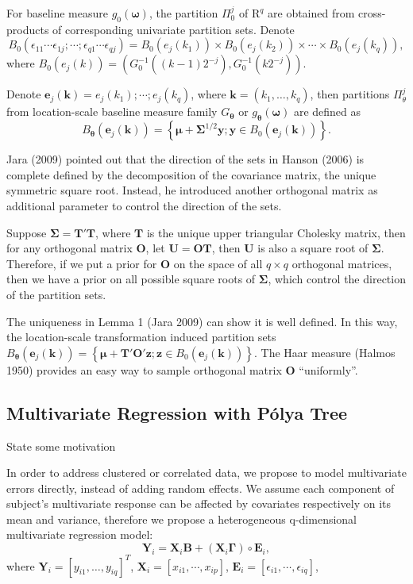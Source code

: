 \documentclass{article}
\newcommand{\polya}{P\'{o}lya}
\begin{document}
For baseline measure $g_0(\bm{\omega})$, the partition $\Pi_0^j$ of
$\mathrm{R}^q$ are obtained from cross-products of corresponding
univariate partition sets. Denote 
$$B_0( \epsilon_{11}\cdots
    \epsilon_{1j};\cdots;\epsilon_{q1}\cdots\epsilon_{qj}) =
    B_0(e_j(k_1)) \times B_0(e_j(k_2)) \times \cdots \times
    B_0(e_j(k_q)),$$
where $B_0(e_j(k))= \left( G_0^{-1}((k-1)2^{-j}), G_0^{-1}(k2^{-j})
\right)$. 

Denote $\bm{e}_j(\bm{k})= e_j(k_1); \cdots;e_j(k_q)$, where $\bm{k}=
(k_1, \ldots, k_q)$, then partitions $\Pi_{\theta}^j$ from
location-scale baseline measure family $G_{\bm{\theta}}$ or
$g_{\bm{\theta}}(\bm{\omega})$ are defined as 
\begin{displaymath}
B_{\bm{\theta}}(\bm{e}_j(\bm{k})) = \left\{ \bm{\mu} +
  \bm{\Sigma}^{1/2} \bm{y}; \bm{y} \in B_0(\bm{e}_j(\bm{k})) \right\}.
\end{displaymath}

Jara (2009) pointed out that the direction of the sets in Hanson
(2006) is complete defined by the decomposition of the covariance
matrix, the unique symmetric square root. Instead, he introduced
another orthogonal matrix as additional parameter to control the
direction of the sets. 

Suppose $\bm{\Sigma} = \bm{T'T}$, where $\bm{T}$ is the unique upper
triangular Cholesky matrix, then for any orthogonal matrix $\bm{O}$,
let $\bm{U=OT}$, then $\bm{U}$ is also a square root of
$\bm{\Sigma}$. Therefore, if we put a prior for $\bm{O}$ on the space
of all $q \times q$ orthogonal matrices, then we have a prior on all
possible square roots of $\bm{\Sigma}$, which control the direction of
the partition sets.

The uniqueness in Lemma 1 (Jara 2009) can show it is well defined. In
this way, the location-scale transformation induced partition sets $B_{\bm{\theta}}(\bm{e}_j(\bm{k})) = \left\{ \bm{\mu} +
  \bm{T'O'} \bm{z}; \bm{z} \in B_0(\bm{e}_j(\bm{k})) \right\}.$ The
Haar measure (Halmos 1950) provides an easy way to sample orthogonal
matrix $\bm{O}$ ``uniformly''. 

\subsection{Multivariate Regression with \polya{} Tree}
State some motivation

In order to address clustered or correlated data, we propose to model
multivariate errors directly, instead of adding random effects. We
assume each component of subject's multivariate response can be
affected by covariates respectively on its mean and variance,
therefore we propose a heterogeneous q-dimensional multivariate
regression model: 
\begin{displaymath}
\bm{Y}_i = \bm{X}_i \bm{B} + (\bm{X}_i\bm{\Gamma}) \circ \bm{E}_i,
\end{displaymath}
where $\bm{Y}_i = [y_{i1}, \ldots, y_{iq}]^T$, $\bm{X}_i= [x_{i1},
\cdots, x_{ip}]$, $\bm{E}_i =[\epsilon_{i1}, \cdots, \epsilon_{iq}]$, 
\end{document}
